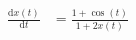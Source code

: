 \begin{align}
\frac{\mathrm{d} x\left( t \right)}{\mathrm{d}t} &= \frac{1 + \cos\left( t \right)}{1 + 2 x\left( t \right)}
\end{align}
